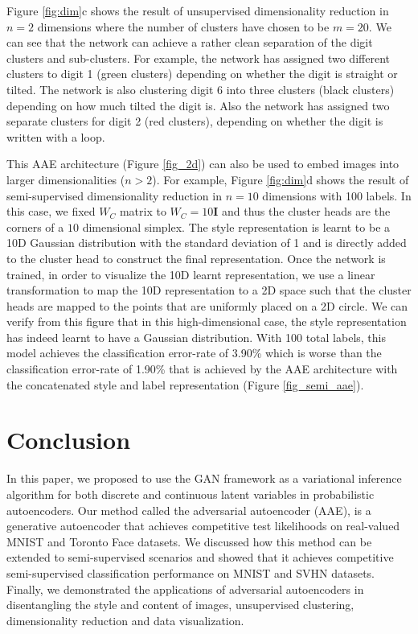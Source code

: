 \documentclass{article}
\begin{document}
Figure \ref{fig:dim}c shows the result of unsupervised dimensionality reduction in $n=2$ dimensions where the number of clusters have chosen to be $m=20$. We can see that the network can achieve a rather clean separation of the digit clusters and sub-clusters. For example, the network has assigned two different clusters to digit 1 (green clusters) depending on whether the digit is straight or tilted. The network is also clustering digit 6 into three clusters (black clusters) depending on how much tilted the digit is. Also the network has assigned two separate clusters for digit 2 (red clusters), depending on whether the digit is written with a loop.

This AAE architecture (Figure \ref{fig_2d}) can also be used to embed images into larger dimensionalities ($n>2$). For example, Figure \ref{fig:dim}d shows the result of semi-supervised dimensionality reduction in $n=10$ dimensions with 100 labels. In this case, we fixed $W_C$ matrix to $W_C = 10\mathbf{I}$ and thus the cluster heads are the corners of a $10$ dimensional simplex. The style representation is learnt to be a 10D Gaussian distribution with the standard deviation of 1 and is directly added to the cluster head to construct the final representation. Once the network is trained, in order to visualize the 10D learnt representation, we use a linear transformation to map the 10D representation to a 2D space such that the cluster heads are mapped to the points that are uniformly placed on a 2D circle. We can verify from this figure that in this high-dimensional case, the style representation has indeed learnt to have a Gaussian distribution. With 100 total labels, this model achieves the classification error-rate of 3.90\% which is worse than the classification error-rate of 1.90\% that is achieved by the AAE architecture with the concatenated style and label representation (Figure \ref{fig_semi_aae}).

\section{Conclusion}

In this paper, we proposed to use the GAN framework as a variational inference algorithm for both discrete and continuous latent variables in probabilistic autoencoders. Our method called the adversarial autoencoder (AAE), is a generative autoencoder that achieves competitive test likelihoods on real-valued MNIST and Toronto Face datasets. We discussed how this method can be extended to semi-supervised scenarios and showed that it achieves competitive semi-supervised classification performance on MNIST and SVHN datasets. Finally, we demonstrated the applications of adversarial autoencoders in disentangling the style and content of images, unsupervised clustering, dimensionality reduction and data visualization.
\end{document}
